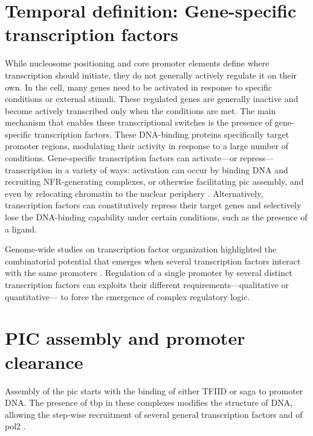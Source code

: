 \section{Temporal definition: Gene-specific transcription factors}
While nucleosome positioning and core promoter elements define where transcription should initiate, they do not generally actively regulate it on their own.  
In the cell, many genes need to be activated in response to specific conditions or external stimuli.
These regulated genes are generally inactive and become actively transcribed only when the conditions are met.
The main mechanism that enables these transcriptional switches is the presence of gene-specific transcription factors.
These DNA-binding proteins specifically target promoter regions, modulating their activity in response to a large number of conditions.
Gene-specific transcription factors can activate---or repress---transcription in a variety of ways: activation can occur by binding DNA and recruiting NFR-generating complexes, or otherwise facilitating \gls{pic} assembly, and even by relocating chromatin to the nuclear periphery \citep{randisehinchliff:2016:transcription}.
Alternatively, transcription factors can constitutively repress their target genes and selectively lose the DNA-binding capability under certain conditions, such as the presence of a ligand.

Genome-wide studies on transcription factor organization highlighted the combinatorial potential that emerges when several transcription factors interact with the same promoters \cite{harbison:2004:transcriptional}.
Regulation of a single promoter by several distinct transcription factors can exploits their different requirements---qualitative or quantitative--- to force the emergence of complex regulatory logic.

\section{PIC assembly and promoter clearance}

Assembly of the \acrlong{pic} starts with the binding of either TFIID or \gls{saga} to promoter DNA.
The presence of \gls{tbp} in these complexes modifies the structure of DNA, allowing the step-wise recruitment of several general transcription factors and of \gls{pol2} \citep[For review see][]{sainsbury:2015:structural}.

